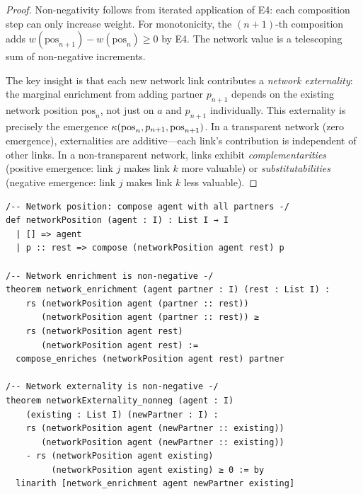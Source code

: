 \begin{proof}
Non-negativity follows from iterated application of E4: each composition
step can only increase weight. For monotonicity, the $(n+1)$-th composition
adds $w(\text{pos}_{n+1}) - w(\text{pos}_n) \geq 0$ by E4. The network
value is a telescoping sum of non-negative increments.

The key insight is that each new network link contributes a
\emph{network externality}: the marginal enrichment from adding partner
$p_{n+1}$ depends on the existing network position $\text{pos}_n$, not
just on $a$ and $p_{n+1}$ individually. This externality is precisely
the emergence $\kappa(\text{pos}_n, p_{n+1}, \text{pos}_{n+1})$. In a
transparent network (zero emergence), externalities are additive---each
link's contribution is independent of other links. In a non-transparent
network, links exhibit \emph{complementarities} (positive emergence:
link $j$ makes link $k$ more valuable) or \emph{substitutabilities}
(negative emergence: link $j$ makes link $k$ less valuable).
\end{proof}

\begin{lstlisting}[caption={Lean 4: Network enrichment}]
/-- Network position: compose agent with all partners -/
def networkPosition (agent : I) : List I → I
  | [] => agent
  | p :: rest => compose (networkPosition agent rest) p

/-- Network enrichment is non-negative -/
theorem network_enrichment (agent partner : I) (rest : List I) :
    rs (networkPosition agent (partner :: rest))
       (networkPosition agent (partner :: rest)) ≥
    rs (networkPosition agent rest)
       (networkPosition agent rest) :=
  compose_enriches (networkPosition agent rest) partner

/-- Network externality is non-negative -/
theorem networkExternality_nonneg (agent : I)
    (existing : List I) (newPartner : I) :
    rs (networkPosition agent (newPartner :: existing))
       (networkPosition agent (newPartner :: existing))
    - rs (networkPosition agent existing)
         (networkPosition agent existing) ≥ 0 := by
  linarith [network_enrichment agent newPartner existing]
\end{lstlisting}

